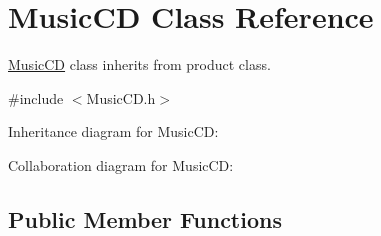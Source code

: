 \hypertarget{classMusicCD}{}\section{Music\+CD Class Reference}
\label{classMusicCD}


\hyperlink{classMusicCD}{Music\+CD} class inherits from product class.  




{\ttfamily \#include $<$Music\+C\+D.\+h$>$}



Inheritance diagram for Music\+CD\+:


Collaboration diagram for Music\+CD\+:
\subsection*{Public Member Functions}
